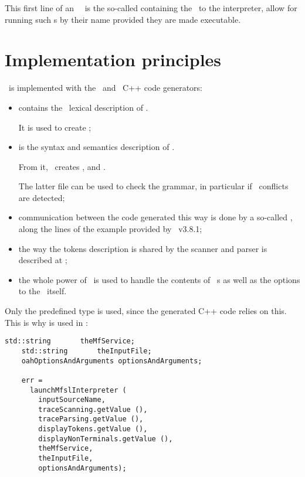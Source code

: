 This first line of an \mfslLang\ \script\ is the so-called  containing the \filePath\ to the interpreter, allow for running such \script s by their name provided they are made executable.


\section{Implementation principles}

\mfslLang\ is implemented with the \flex\ and \bison\ C++ code generators:
\begin{itemize}
\item {} contains the \flex\ lexical description of \mfslLang.

It is used to create ;

\item {} is the syntax and semantics description of \mfslLang.

From it, \bison\ creates ,  and .

The latter file can be used to check the grammar, in particular if \LR\ conflicts are detected;

\item communication between the code generated this way is done by a so-called , along the lines of the  example provided by \bison\ v3.8.1;

\item the way the tokens description is shared by the scanner and parser is described at ;

\item the whole power of \oahRepr\ is used to handle the contents of \mfslLang\ \script s as well as the options to the \mfslInterp\ itself.
\end{itemize}

Only the predefined  type is used, since the generated C++ code relies on this. This is why  is used in :
\begin{lstlisting}[language=CPlusPlus]
    std::string       theMfService;
    std::string       theInputFile;
    oahOptionsAndArguments optionsAndArguments;

    err =
      launchMfslInterpreter (
        inputSourceName,
        traceScanning.getValue (),
        traceParsing.getValue (),
        displayTokens.getValue (),
        displayNonTerminals.getValue (),
        theMfService,
        theInputFile,
        optionsAndArguments);
\end{lstlisting}


